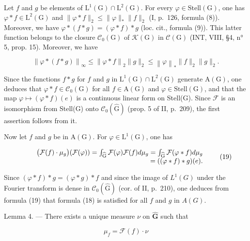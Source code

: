 Let \(f\) and \(g\) be elements of \(\mathrm{L}^{1}(\mathrm{G}) \cap \mathrm{L}^{2}(\mathrm{G})\). For every \(\varphi \in \mathrm{Stell}(\mathrm{G})\), one has \(\varphi * f \in \mathrm{L}^{2}(\mathrm{G})\) and \(\| \varphi * f \|_{2} \leqslant \| \varphi \|_{*} \| f \|_{2}\) (I, p.~126, formula (8)). Moreover, we have \(\varphi * (f * g) = (\varphi * f) * g\) (loc. cit., formula (9)). This latter function belongs to the closure \(\mathcal{C}_{0}(\mathrm{G})\) of \(\mathcal{K}(\mathrm{G})\) in \(\mathcal{C}(\mathrm{G})\) (INT, VIII, §4, n° 5, prop. 15). Moreover, we have

\[
\left\| \varphi * (f * g) \right\| _ {\infty} \leqslant \left\| \varphi * f \right\| _ {2} \| g \| _ {2} \leqslant \left\| \varphi \right\| _ {*} \| f \| _ {2} \| g \| _ {2}.
\]

Since the functions \(f * g\) for \(f\) and \(g\) in \(\mathrm{L}^1(\mathrm{G}) \cap \mathrm{L}^2(\mathrm{G})\) generate \(\mathrm{A}(\mathrm{G})\), one deduces that \(\varphi * f \in \mathcal{C}_0(\mathrm{G})\) for all \(f \in \mathrm{A}(\mathrm{G})\) and \(\varphi \in \mathrm{Stell}(\mathrm{G})\), and that the map \(\varphi \mapsto (\varphi * f)(e)\) is a continuous linear form on Stell(G). Since \(\mathcal{F}\) is an isomorphism from Stell(G) onto \(\mathcal{C}_{0}(\widehat{\mathrm{G}})\) (prop. 5 of II, p.~209), the first assertion follows from it.

Now let \(f\) and \(g\) be in \(\mathrm{A}(\mathrm{G})\). For \(\varphi \in \mathrm{L}^1 (\mathrm{G})\), one has

\[
\begin{array}{r l r} & & {\big (\mathcal {F} (f) \cdot \mu_ {g} \big) (\mathcal {F} (\varphi)) = \int_ {\widehat {\mathrm{G}}} \mathcal {F} (\varphi) \mathcal {F} (f) d \mu_ {g} = \int_ {\widehat {\mathrm{G}}} \mathcal {F} (\varphi * f) d \mu_ {g}} \\ & & {= ((\varphi * f) * g) (e).} \end{array}\tag{19}
\]

Since \((\varphi*f)*g=(\varphi*g)*f\) and since the image of \(L^{1}(G)\) under the Fourier transform is dense in \(\mathcal{C}_{0}(\widehat{\mathrm{G}})\) (cor. of II, p.~210), one deduces from formula (19) that formula (18) is satisfied for all \(f\) and \(g\) in \(A(G)\).

Lemma 4. --- There exists a unique measure \(\nu\) on \(\widehat{\mathbf{G}}\) such that

\[
\mu_ {f} = \mathcal {F} (f) \cdot \nu
\]

